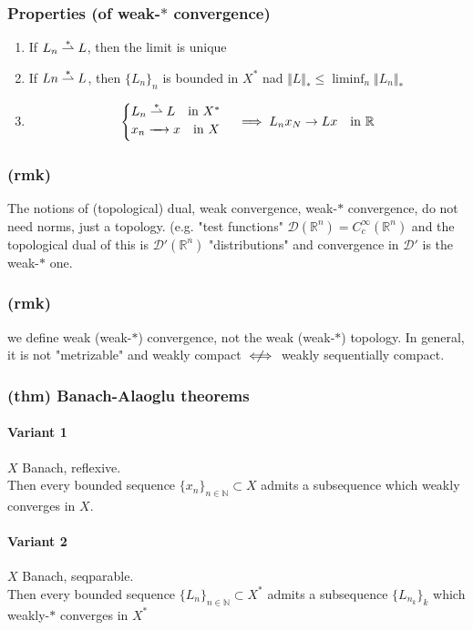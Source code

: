 \subsubsection{Properties (of weak-$*$ convergence)}
\begin{enumerate}
    \item If $L_n\stackrel{\ast}{\rightharpoonup} L$, then the limit is unique
    \item If $Ln\stackrel{\ast}{\rightharpoonup} L$, then $\{L_n\}_n$ is bounded in $X^*$ nad $\Vert L\Vert_*\leq \liminf_n \Vert L_n\Vert_*$
    \item $$\begin{cases}
        L_n\stackrel{\ast}{\rightharpoonup} L \quad \text{in }X^*\\
        x_n\xrightarrow[\quad]{}x \quad \text{in }X
    \end{cases}\implies L_nx_N\to Lx\quad \text{in }\mathbb R$$
\end{enumerate}
\subsubsection{(rmk)}
The notions of (topological) dual, weak convergence, weak-$*$ convergence, do not need norms, just a topology.
(e.g. "test functions" $\mathcal D(\mathbb R^n)=C_c^\infty(\mathbb R^n)$ and the topological dual of this is $\mathcal D'(\mathbb R^n)$ "distributions" and convergence in $\mathcal D'$ is the weak-$*$ one.
\subsubsection{(rmk)}
we define weak (weak-$*$) convergence, not the weak (weak-$*$) topology. In general, it is not "metrizable" and weakly compact $\centernot\iff$ weakly sequentially compact.
\subsubsection{(thm) Banach-Alaoglu theorems}
\paragraph{Variant 1}
$X$ Banach, reflexive.\\
Then every bounded sequence $\{x_n\}_{n\in \mathbb N}\subset X$ admits a subsequence which weakly converges in $X$.
\paragraph{Variant 2}
$X$ Banach, seqparable.\\
Then every bounded sequence $\{L_n\}_{n\in \mathbb N}\subset X^*$ admits a subsequence $\{L_{n_k}\}_k$ which weakly-$*$ converges in $X^*$
